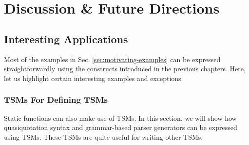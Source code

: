 \chapter{Discussion \& Future Directions}\label{chap:conclusion}
\section{Interesting Applications}
Most of the examples in Sec. \ref{sec:motivating-examples} can be expressed straightforwardly using the constructs introduced in the previous chapters. Here, let us highlight certain interesting examples and exceptions.

\subsection{TSMs For Defining TSMs}\label{sec:tsms-for-tsms}
Static functions can also make use of TSMs. In this section, we will show how quasiquotation syntax and grammar-based parser generators can be expressed using TSMs. These TSMs are quite useful for writing other TSMs.
